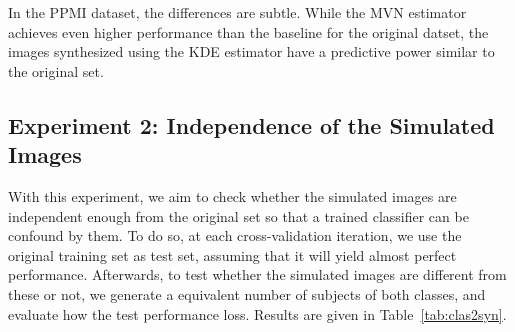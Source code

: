 In the PPMI dataset, the differences are subtle. While the \ac{MVN} estimator achieves even higher performance than the baseline for the original datset, the images synthesized using the \ac{KDE} estimator have a predictive power similar to the original set. 


\subsection{Experiment 2: Independence of the Simulated Images}
With this experiment, we aim to check whether the simulated images are independent enough from the original set so that a trained classifier can be confound by them. To do so, at each cross-validation iteration, we use the original training set as test set, assuming that it will yield almost perfect performance. Afterwards, to test whether the simulated images are different from these or not, we generate a equivalent number of subjects of both classes, and evaluate how the test performance loss. Results are given in Table~\ref{tab:clas2syn}. 

